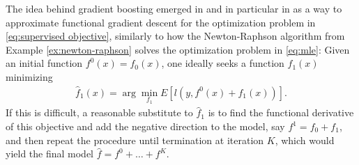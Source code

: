 The idea behind gradient boosting emerged in \citet{friedman2001greedy} and in particular in \citet{mason1999boosting} as a way to approximate functional gradient descent for the optimization problem in \eqref{eq:supervised objective}, similarly to how the Newton-Raphson algorithm from Example \ref{ex:newton-raphson} solves the optimization problem in \eqref{eq:mle}:
Given an initial function $f^0(x)=f_0(x)$, one ideally seeks a function $f_1(x)$ minimizing
\begin{align}
	\hat{f}_1(x) = \arg\min_{f_1} E\left[ l\left(y,f^0(x)+f_1(x)\right) \right].
\end{align}
If this is difficult, a reasonable substitute to $\hat{f}_1$ is to find the functional derivative of this objective and add the negative direction to the model, say $f^1 = f_0 + f_1$, and then repeat the procedure until termination at iteration $K$, which would yield the final model $\hat{f}=f^0+\dots+f^K$.

